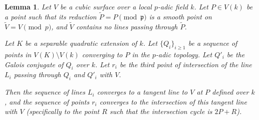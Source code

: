 \documentclass[10pt,a4paper]{amsart}
\newtheorem{lemma}{Lemma}
\begin{document}
\begin{lemma}
\label{thm:tanglimit}
Let $V$ be a cubic surface over a local $p$-adic field $k$. Let $P \in V(k)$ be a point such that its reduction $\tilde{P} = P \pmod{\mathfrak{p}}$ is a smooth point on $\tilde{V} = V \pmod p$, and $\tilde{V}$ contains no lines passing through $\tilde{P}$.

Let $K$ be a separable quadratic extension of $k$. Let $\{Q_i\}_{i \ge 1}$ be a sequence of points in $V(K) \setminus V(k)$ converging to $P$ in the $p$-adic topology. Let $Q'_i$ be the Galois conjugate of $Q_i$ over $k$. Let $r_i$ be the third point of intersection of the line $L_i$ passing through $Q_i$ and $Q'_i$ with $V$.

Then the sequence of lines $L_i$ converges to a tangent line to $V$ at $P$ defined over $k$, and the sequence of points $r_i$ converges to the intersection of this tangent line with $V$ (specifically to the point $R$ such that the intersection cycle is $2P+R$).
\end{lemma}
\end{document}
